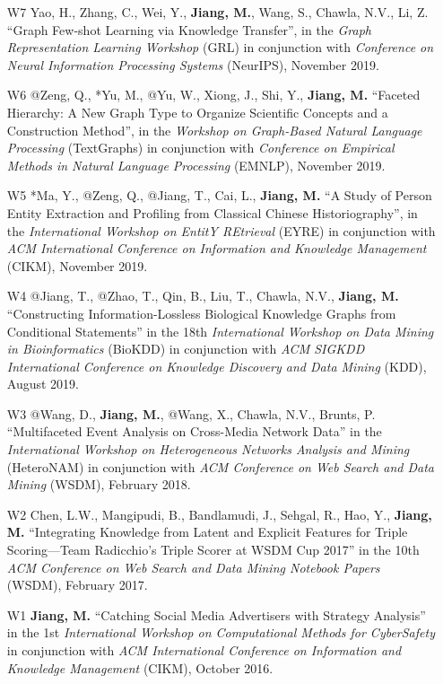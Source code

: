 \documentclass[10pt]{article}
\newenvironment{myindentpar}[1]%
{\begin{list}{}%
         {\setlength{\leftmargin}{#1}}%
         \item[]%
}
{\end{list}}
\newcounter{list}
\begin{document}
\begin{myindentpar}{0.00cm}
\begin{enumerate}[leftmargin=.5cm]
\item[W7] Yao, H., Zhang, C., Wei, Y., \textbf{Jiang, M.}, Wang, S., Chawla, N.V., Li, Z. ``Graph Few-shot Learning via Knowledge Transfer'', in the \textit{Graph Representation Learning Workshop} (GRL) in conjunction with \textit{Conference on Neural Information Processing Systems} (NeurIPS), November 2019.
	
\item[W6] @Zeng, Q., *Yu, M., @Yu, W., Xiong, J., Shi, Y., \textbf{Jiang, M.} ``Faceted Hierarchy: A New Graph Type to Organize Scientific Concepts and a Construction Method'', in the \textit{Workshop on Graph-Based Natural Language Processing} (TextGraphs) in conjunction with \textit{Conference on Empirical Methods in Natural Language Processing} (EMNLP), November 2019.

\item[W5] *Ma, Y., @Zeng, Q., @Jiang, T., Cai, L., \textbf{Jiang, M.} ``A Study of Person Entity Extraction and Profiling from Classical Chinese Historiography'', in the \textit{International Workshop on EntitY REtrieval} (EYRE) in conjunction with \textit{ACM International Conference on Information and Knowledge Management} (CIKM), November 2019.

\item[W4] @Jiang, T., @Zhao, T., Qin, B., Liu, T., Chawla, N.V., \textbf{Jiang, M.} ``Constructing Information-Lossless Biological Knowledge Graphs from Conditional Statements'' in the 18th \textit{International Workshop on Data Mining in Bioinformatics} (BioKDD) in conjunction with \textit{ACM SIGKDD International Conference on Knowledge Discovery and Data Mining} (KDD), August 2019.

\item[W3] @Wang, D., \textbf{Jiang, M.}, @Wang, X., Chawla, N.V., Brunts, P. ``Multifaceted Event Analysis on Cross-Media Network Data'' in the \textit{International Workshop on Heterogeneous Networks Analysis and Mining} (HeteroNAM) in conjunction with \textit{ACM Conference on Web Search and Data Mining} (WSDM), February 2018.

\item[W2] Chen, L.W., Mangipudi, B., Bandlamudi, J., Sehgal, R., Hao, Y., \textbf{Jiang, M.} ``Integrating Knowledge from Latent and Explicit Features for Triple Scoring—Team Radicchio's Triple Scorer at WSDM Cup 2017'' in the 10th \textit{ACM Conference on Web Search and Data Mining Notebook Papers} (WSDM), February 2017.

\item[W1] \textbf{Jiang, M.} ``Catching Social Media Advertisers with Strategy Analysis'' in the 1st \textit{International Workshop on Computational Methods for CyberSafety} in conjunction with \textit{ACM International Conference on Information and Knowledge Management} (CIKM), October 2016.


\end{enumerate}
\end{myindentpar}
\end{document}
